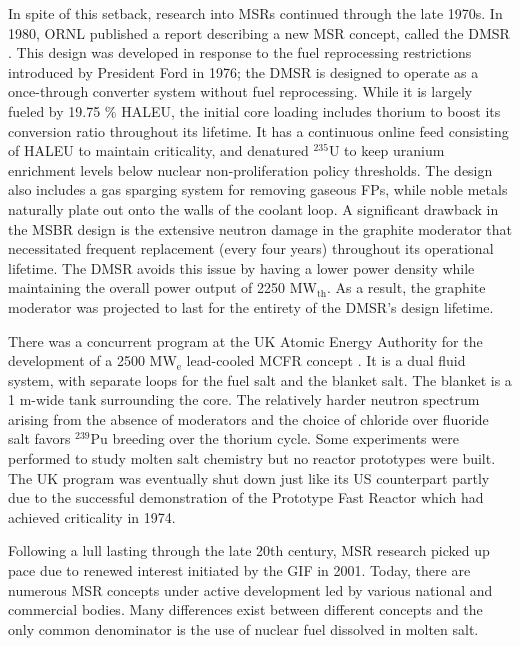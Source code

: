 In spite of this setback, research into \glspl{MSR} continued through the late
1970s. In 1980, \gls{ORNL} published a report describing a new \gls{MSR}
concept, called the \gls{DMSR} \cite{gehin_liquid_2016}. This design was
developed in response to the fuel reprocessing restrictions introduced by
President Ford in 1976; the \gls{DMSR} is designed to operate as a
once-through converter system without fuel reprocessing. While it is largely
fueled by 19.75 \% \gls{HALEU}, the initial core loading includes thorium to
boost its conversion ratio throughout its lifetime. It has a continuous
online feed consisting of \gls{HALEU} to maintain criticality, and denatured
$^{235}$U to keep uranium enrichment levels below nuclear non-proliferation
policy thresholds. The design also includes a gas sparging system for removing
gaseous \glspl{FP}, while noble metals naturally plate out onto the walls of
the coolant loop. A significant drawback in the \gls{MSBR} design is the
extensive neutron damage in the graphite moderator that necessitated frequent
replacement (every four years) throughout its operational lifetime. The
\gls{DMSR} avoids this issue by having a lower power density while maintaining
the overall power output of 2250 MW$_{\text{th}}$. As a result, the graphite
moderator was projected to last for the entirety of the \gls{DMSR}'s design
lifetime.

There was a concurrent program at the UK Atomic Energy Authority for the
development of a 2500 MW$_{\text{e}}$ lead-cooled
\gls{MCFR} concept \cite{smith_assessment_1974}. It is a dual fluid system,
with separate loops for the fuel salt and the blanket salt. The blanket is a
1 m-wide tank surrounding the core. The relatively harder neutron spectrum
arising from the absence of moderators and the choice of chloride over
fluoride salt favors $^{239}$Pu breeding over the thorium cycle. Some
experiments were performed to study molten salt chemistry but no reactor
prototypes were built. The UK program was eventually shut down just like its
US counterpart partly due to the successful demonstration of the Prototype
Fast Reactor which had achieved criticality in 1974.

Following a lull lasting through the late 20th century, \gls{MSR} research
picked up pace due to renewed interest initiated by the \gls{GIF} in 2001.
Today, there are numerous \gls{MSR} concepts under active development led by
various national and commercial bodies. Many differences exist between
different concepts and the only common denominator is the use of nuclear fuel
dissolved in molten salt.

